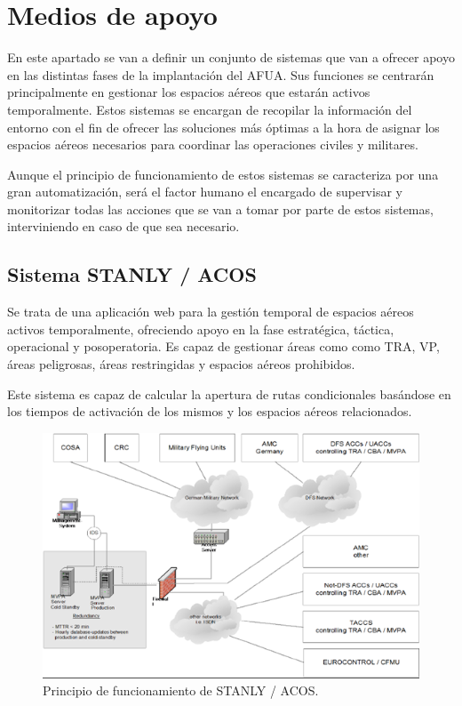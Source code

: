\section{Medios de apoyo}

En este apartado se van a definir un conjunto de sistemas que van a ofrecer apoyo en las distintas fases de la implantación del AFUA. Sus funciones se centrarán principalmente en gestionar los espacios aéreos que estarán activos temporalmente. Estos sistemas se encargan de recopilar la información del entorno con el fin de ofrecer las soluciones más óptimas a la hora de asignar los espacios aéreos necesarios para coordinar las operaciones civiles y militares.  

Aunque el principio de funcionamiento de estos sistemas se caracteriza por una gran automatización, será el factor humano el encargado de supervisar y monitorizar todas las acciones que se van a tomar por parte de estos sistemas, interviniendo en caso de que sea necesario.

\subsection{Sistema STANLY / ACOS}

Se trata de una aplicación web para la gestión temporal de espacios aéreos activos temporalmente, ofreciendo apoyo en la fase estratégica, táctica, operacional y posoperatoria.  Es capaz de gestionar áreas como como TRA, VP, áreas peligrosas, áreas restringidas y espacios aéreos prohibidos.  

Este sistema es capaz de calcular la apertura de rutas condicionales basándose en los tiempos de activación de los mismos y los espacios aéreos relacionados. 

\begin{figure}[H]
    \centering
    \includegraphics[width=0.8\linewidth]{figuras/stanly_acos.png}
    \caption{Principio de funcionamiento de STANLY / ACOS.}
    \label{fig:stanly_acos}
\end{figure}

